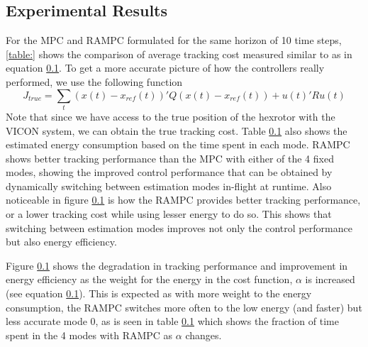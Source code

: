 \subsection{Experimental Results}

For the MPC and RAMPC formulated for the same horizon of 10 time steps, \ref{table:} shows the comparison of average tracking cost measured similar to as in equation \ref{}. To get a more accurate picture of how the controllers really performed, we use the following function 
\begin{equation}
J_{true} = \sum_t (x(t)-x_{ref}(t))'Q(x(t)-x_{ref}(t)) + u(t)'Ru(t)
\end{equation}
Note that since we have access to the true position of the hexrotor with the VICON system, we can obtain the true tracking cost. Table \ref{} also shows the estimated energy consumption based on the time spent in each mode. RAMPC shows better tracking performance than the MPC with either of the 4 fixed modes, showing the improved control performance that can be obtained by dynamically switching between estimation modes in-flight at runtime. Also noticeable in figure \ref{} is how the RAMPC provides better tracking performance, or a lower tracking cost while using lesser energy to do so. This shows that switching between estimation modes improves not only the control performance but also energy efficiency. 

Figure \ref{} shows the degradation in tracking performance and improvement in energy efficiency as the weight for the energy in the cost function, $\alpha$ is increased (see equation \ref{}). This is expected as with more weight to the energy consumption, the RAMPC switches more often to the low energy (and faster) but less accurate mode 0, as is seen in table \ref{} which shows the fraction of time spent in the 4 modes with RAMPC as $\alpha$ changes. 